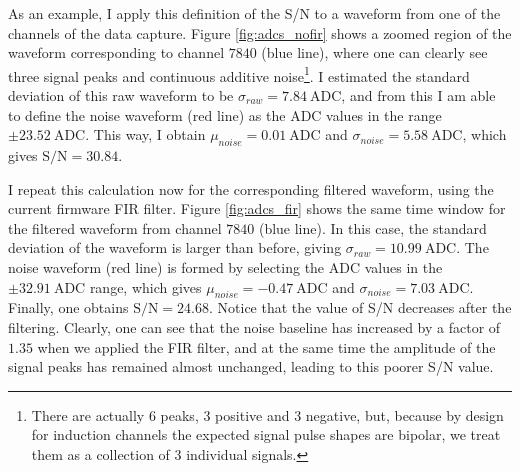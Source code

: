 As an example, I apply this definition of the S/N to a waveform from one of the channels of the data capture. Figure \ref{fig:adcs_nofir} shows a zoomed region of the waveform corresponding to channel $7840$ (blue line), where one can clearly see three signal peaks and continuous additive noise\footnote{There are actually 6 peaks, 3 positive and 3 negative, but, because by design for induction channels the expected signal pulse shapes are bipolar, we treat them as a collection of 3 individual signals.}. I estimated the standard deviation of this raw waveform to be $\sigma_{raw} = 7.84 ~ \mathrm{ADC}$, and from this I am able to define the noise waveform (red line) as the ADC values in the range $\pm 23.52 ~ \mathrm{ADC}$. This way, I obtain $\mu_{noise} = 0.01 ~ \mathrm{ADC}$ and $\sigma_{noise} = 5.58 ~ \mathrm{ADC}$, which gives $\mathrm{S/N} = 30.84$.

I repeat this calculation now for the corresponding filtered waveform, using the current firmware FIR filter. Figure \ref{fig:adcs_fir} shows the same time window for the filtered waveform from channel $7840$ (blue line). In this case, the standard deviation of the waveform is larger than before, giving $\sigma_{raw} = 10.99 ~ \mathrm{ADC}$. The noise waveform (red line) is formed by selecting the ADC values in the $\pm 32.91 ~ \mathrm{ADC}$ range, which gives $\mu_{noise} = -0.47 ~ \mathrm{ADC}$ and $\sigma_{noise} = 7.03 ~ \mathrm{ADC}$. Finally, one obtains $\mathrm{S/N} = 24.68$. Notice that the value of S/N decreases after the filtering. Clearly, one can see that the noise baseline has increased by a factor of $1.35$ when we applied the FIR filter, and at the same time the amplitude of the signal peaks has remained almost unchanged, leading to this poorer S/N value.

